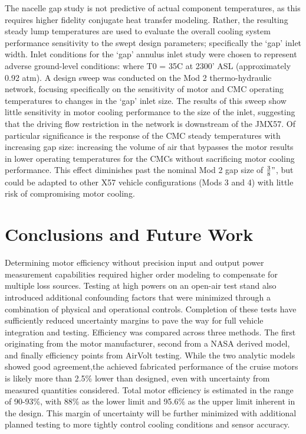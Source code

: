 \documentclass[]{aiaa-tc}%
\begin{document}
The nacelle gap study is not predictive of actual component temperatures,
as this requires higher fidelity conjugate heat transfer modeling. 
Rather, the resulting steady lump temperatures are used to evaluate the overall cooling system performance sensitivity to the swept design parameters; specifically the `gap' inlet width.  Inlet conditions for the `gap' annulus inlet study were chosen to represent adverse ground-level conditions:
where T0 = 35\degree C at 2300' ASL (approximately 0.92 atm).  
A design sweep was conducted on the Mod 2 thermo-hydraulic network, focusing specifically on the sensitivity of motor and CMC operating temperatures to changes in the `gap' inlet size.  
The results of this sweep show little sensitivity in motor cooling performance to the size of the inlet, suggesting that the driving flow restriction in the network is downstream of the JMX57.  Of particular significance is the response of the CMC steady temperatures with increasing gap size:  increasing the volume of air that bypasses the motor results in lower operating temperatures for the CMCs without sacrificing motor cooling performance.  This effect diminishes past the nominal Mod 2 gap size of $\frac{3}{8}"$, but could be adapted to other X57 vehicle configurations (Mods 3 and 4) with little risk of compromising motor cooling.


\section{Conclusions and Future Work}

Determining motor efficiency without precision input and output power measurement capabilities required higher order modeling to compensate for multiple loss sources. 
Testing at high powers on an open-air test stand also introduced additional confounding factors that were minimized through a combination of physical and operational controls.
Completion of these tests have sufficiently reduced uncertainty margins to pave the way for full vehicle integration and testing. Efficiency was compared across three methods. The first originating from the motor manufacturer, second from a NASA derived model, and finally efficiency points from AirVolt testing. While the two analytic models showed good agreement,the achieved fabricated performance of the cruise motors is likely more than 2.5\% lower than designed, even with uncertainty from measured quantities considered. Total motor efficiency is estimated in the range of 90-93\%, with 88\% as the lower limit and 95.6\% as the upper limit inherent in the design. This margin of uncertainty will be further minimized with additional planned testing to more tightly control cooling conditions and sensor accuracy.
\end{document}
